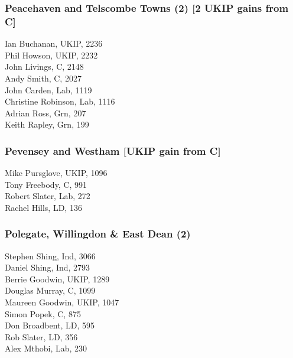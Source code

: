 \documentclass[a4paper,openany,10pt]{book}
\begin{document}
\subsubsection*{Peacehaven and Telscombe Towns (2) \hspace*{\fill}\nolinebreak[1]%
\enspace\hspace*{\fill}
[2 UKIP gains from C]}



Ian Buchanan, UKIP, 2236\\
Phil Howson, UKIP, 2232\\
John Livings, C, 2148\\
Andy Smith, C, 2027\\
John Carden, Lab, 1119\\
Christine Robinson, Lab, 1116\\
Adrian Ross, Grn, 207\\
Keith Rapley, Grn, 199\\


\subsubsection*{Pevensey and Westham \hspace*{\fill}\nolinebreak[1]%
\enspace\hspace*{\fill}
[UKIP gain from C]}



Mike Pursglove, UKIP, 1096\\
Tony Freebody, C, 991\\
Robert Slater, Lab, 272\\
Rachel Hills, LD, 136\\


\subsubsection*{Polegate, Willingdon \& East Dean (2)}



Stephen Shing, Ind, 3066\\
Daniel Shing, Ind, 2793\\
Berrie Goodwin, UKIP, 1289\\
Douglas Murray, C, 1099\\
Maureen Goodwin, UKIP, 1047\\
Simon Popek, C, 875\\
Don Broadbent, LD, 595\\
Rob Slater, LD, 356\\
Alex Mthobi, Lab, 230\\
\end{document}
